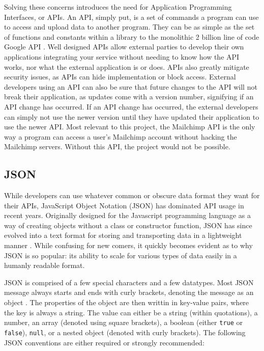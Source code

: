 \documentclass[11pt]{article}
\begin{document}
Solving these concerns introduces the need for Application Programming Interfaces, or APIs. An API, simply put, is a set of commands a program can use to access and upload data to another program. They can be as simple as the set of functions and constants within a library to the monolithic 2 billion line of code Google API \cite{google-api}. Well designed APIs allow external parties to develop their own applications integrating your service without needing to know how the API works, nor what the external application is or does. APIs also greatly mitigate security issues, as APIs can hide implementation or block access. External developers using an API can also be sure that future changes to the API will not break their application, as updates come with a version number, signifying if an API change has occurred. If an API change has occurred, the external developers can simply not use the newer version until they have updated their application to use the newer API. Most relevant to this project, the Mailchimp API is the only way a program can access a user's Mailchimp account without hacking the Mailchimp servers. Without this API, the project would not be possible.

\subsection{JSON}

While developers can use whatever common or obscure data format they want for their APIs, JavaScript Object Notation (JSON) has dominated API usage in recent years. Originally designed for the Javascript programming language as a way of creating objects without a class or constructor function, JSON has since evolved into a text format for storing and transporting data in a lightweight manner \cite{json}. While confusing for new comers, it quickly becomes evident as to why JSON is so popular: its ability to scale for various types of data easily in a humanly readable format.

JSON is comprised of a few special characters and a few datatypes. Most JSON message always starts and ends with curly brackets, denoting the message as an object \cite{json}. The properties of the object are then writtin in key-value pairs, where the key is always a string. The value can either be a string (within quotations), a number, an array (denoted using square brackets), a boolean (either \texttt{true} or \texttt{false}), \texttt{null}, or a nested object (denoted with curly brackets). The following JSON conventions are either required or strongly recommended:
\end{document}
